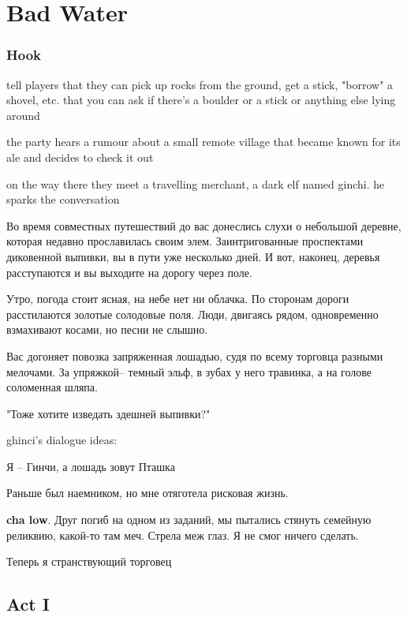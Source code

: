 \documentclass[a5paper,11pt]{book}
\begin{document}
\chapter{Bad Water}
\begin{multicols}{2}

\subsection{Hook}
tell players that they can pick up rocks from the ground, get a stick, "borrow" a shovel, etc. that you can ask if there's a boulder or a stick or anything else lying around

the party hears a rumour about a small remote village that became known for its ale and decides to check it out

on the way there they meet a travelling merchant, a dark elf named ginchi. he sparks the conversation

\begin{boxed}
Во время совместных путешествий до вас донеслись слухи о небольшой деревне, которая недавно прославилась своим элем. Заинтригованные проспектами диковенной выпивки, вы в пути уже несколько дней. И вот, наконец, деревья расступаются и вы выходите на дорогу через поле.

Утро, погода стоит ясная, на небе нет ни облачка. По сторонам дороги расстилаются золотые солодовые поля. Люди, двигаясь рядом, одновременно взмахивают косами, но песни не слышно.

Вас догоняет повозка запряженная лошадью, судя по всему торговца разными мелочами. За упряжкой-- темный эльф, в зубах у него травинка, а на голове соломенная шляпа.

"Тоже хотите изведать здешней выпивки?"
\end{boxed}

ghinci's dialogue ideas:

\begin{boxed}
Я -- Гинчи, а лошадь зовут Пташка

Раньше был наемником, но мне отяготела рисковая жизнь.

\textbf{cha low}. Друг погиб на одном из заданий, мы пытались стянуть семейную реликвию, какой-то там меч. Стрела меж глаз. Я не смог ничего сделать.

Теперь я странствующий торговец
\end{boxed}

\section{Act I}

\end{multicols}
\end{document}
